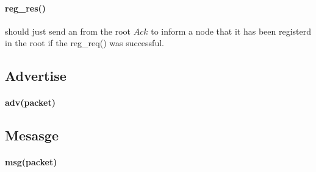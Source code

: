 \documentclass{article}
\begin{document}
\paragraph{reg\_res()} should just send an from the root $Ack$ to inform a node that it has been registerd in the root if the reg\_req() was successful.
\subsection{Advertise}
\paragraph{adv(packet)}
\subsection{Mesasge}
\paragraph{msg(packet)}
\clearpage
\end{document}
